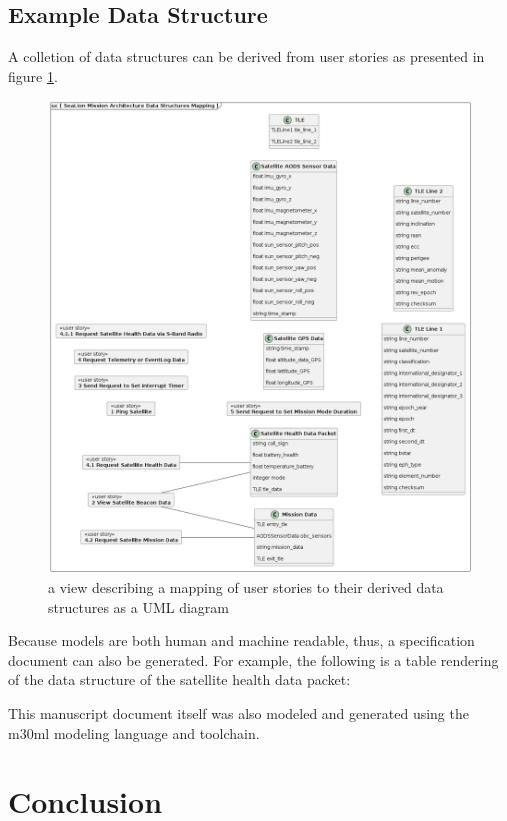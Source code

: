\documentclass[conf]{new-aiaa}
\begin{document}
\subsection{Example Data Structure}

A colletion of data structures can be derived from user stories as presented in figure \ref{data-structures-mapping}.

\begin{figure}[hbt!]
    \centering
    \includegraphics[width=.8\textwidth]{data-structures-mapping}
    \caption{a view describing a mapping of user stories to their derived data structures as a UML diagram}
    \label{data-structures-mapping}
\end{figure}

Because models are both human and machine readable, thus, a specification document can also be generated. For example, the following is a table rendering of the data structure of the satellite health data packet:

\begin{center}

\end{center}

This manuscript document itself was also modeled and generated using the m30ml modeling language and toolchain.


\section{Conclusion}
\end{document}
